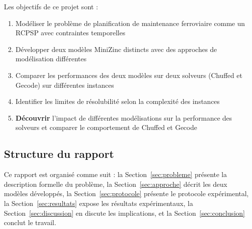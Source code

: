 Les objectifs de ce projet sont :
\begin{enumerate}
    \item Modéliser le problème de planification de maintenance ferroviaire comme un RCPSP avec contraintes temporelles
    \item Développer deux modèles MiniZinc distincts avec des approches de modélisation différentes
    \item Comparer les performances des deux modèles sur deux solveurs (Chuffed et Gecode) sur différentes instances
    \item Identifier les limites de résolubilité selon la complexité des instances
    \item \textbf{Découvrir} l'impact de différentes modélisations sur la performance des solveurs et comparer le comportement de Chuffed et Gecode
\end{enumerate}

\subsection{Structure du rapport}

Ce rapport est organisé comme suit : la Section~\ref{sec:probleme} présente la description formelle du problème, la Section~\ref{sec:approche} décrit les deux modèles développés, la Section~\ref{sec:protocole} présente le protocole expérimental, la Section~\ref{sec:resultats} expose les résultats expérimentaux, la Section~\ref{sec:discussion} en discute les implications, et la Section~\ref{sec:conclusion} conclut le travail.

